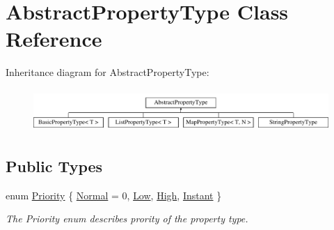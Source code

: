\hypertarget{classAbstractPropertyType}{\section{Abstract\-Property\-Type Class Reference}
\label{classAbstractPropertyType}
}
Inheritance diagram for Abstract\-Property\-Type\-:\begin{figure}[H]
\begin{center}
\leavevmode
\includegraphics[height=1.637427cm]{classAbstractPropertyType}
\end{center}
\end{figure}
\subsection*{Public Types}
\begin{DoxyCompactItemize}
\item 
enum \hyperlink{classAbstractPropertyType_a1e513f66eb2dd2bd2cddbec16422af63}{Priority} \{ \hyperlink{classAbstractPropertyType_a1e513f66eb2dd2bd2cddbec16422af63a3412bc77a6a781fb4a832059f1fe5d9a}{Normal} = 0, 
\hyperlink{classAbstractPropertyType_a1e513f66eb2dd2bd2cddbec16422af63a611e6f3b55352cad8a1602ec8cb3c505}{Low}, 
\hyperlink{classAbstractPropertyType_a1e513f66eb2dd2bd2cddbec16422af63aabbaad7e0356d6929119fc0e17aa6ad0}{High}, 
\hyperlink{classAbstractPropertyType_a1e513f66eb2dd2bd2cddbec16422af63a5ef5703d3d1af9d204d6d2f3cf41569a}{Instant}
 \}
\begin{DoxyCompactList}\small\item\em The Priority enum describes prority of the property type. \end{DoxyCompactList}\end{DoxyCompactItemize}
